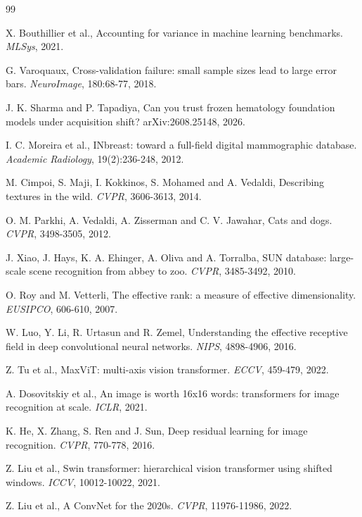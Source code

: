 \documentclass{esannV2}
\begin{document}
\begin{footnotesize}
\begin{thebibliography}{99}

 X. Bouthillier et al., Accounting for variance in machine learning benchmarks. \emph{MLSys}, 2021.

 G. Varoquaux, Cross-validation failure: small sample sizes lead to large error bars. \emph{NeuroImage}, 180:68-77, 2018.

 J. K. Sharma and P. Tapadiya, Can you trust frozen hematology foundation models under acquisition shift? arXiv:2608.25148, 2026.

 I. C. Moreira et al., INbreast: toward a full-field digital mammographic database. \emph{Academic Radiology}, 19(2):236-248, 2012.

 M. Cimpoi, S. Maji, I. Kokkinos, S. Mohamed and A. Vedaldi, Describing textures in the wild. \emph{CVPR}, 3606-3613, 2014.

 O. M. Parkhi, A. Vedaldi, A. Zisserman and C. V. Jawahar, Cats and dogs. \emph{CVPR}, 3498-3505, 2012.

 J. Xiao, J. Hays, K. A. Ehinger, A. Oliva and A. Torralba, SUN database: large-scale scene recognition from abbey to zoo. \emph{CVPR}, 3485-3492, 2010.

 O. Roy and M. Vetterli, The effective rank: a measure of effective dimensionality. \emph{EUSIPCO}, 606-610, 2007.

 W. Luo, Y. Li, R. Urtasun and R. Zemel, Understanding the effective receptive field in deep convolutional neural networks. \emph{NIPS}, 4898-4906, 2016.

 Z. Tu et al., MaxViT: multi-axis vision transformer. \emph{ECCV}, 459-479, 2022.

 A. Dosovitskiy et al., An image is worth 16x16 words: transformers for image recognition at scale. \emph{ICLR}, 2021.

 K. He, X. Zhang, S. Ren and J. Sun, Deep residual learning for image recognition. \emph{CVPR}, 770-778, 2016.

 Z. Liu et al., Swin transformer: hierarchical vision transformer using shifted windows. \emph{ICCV}, 10012-10022, 2021.

 Z. Liu et al., A ConvNet for the 2020s. \emph{CVPR}, 11976-11986, 2022.


\end{thebibliography}
\end{footnotesize}
\end{document}
